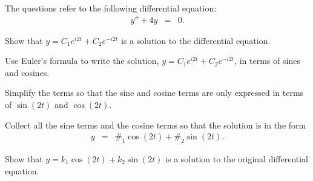   \begin{problem}

  \item The questions refer to the following differential equation:
    \begin{eqnarray*}
      y'' + 4y & = & 0.
    \end{eqnarray*}

    \begin{subproblem}
      \item Show that $y=C_1 e^{i2t} + C_2 e^{-i2t}$ is a solution to
        the differential equation.
        \vfill

      \item Use Euler's formula to write the solution, $y=C_1 e^{i2t}
        + C_2 e^{-i2t}$, in terms of sines and cosines.
        \vfill

        \clearpage

      \item Simplify the terms so that the sine and cosine terms are
        only expressed in terms of $\sin(2t)$ and $\cos(2t)$.

        \vfill

      \item Collect all the sine terms and the cosine terms so that
        the solution is in the form
        \begin{eqnarray*}
          y & = & \#_1 \cos(2t) + \#_2 \sin(2t).
        \end{eqnarray*}
        \vfill

      \item Show that $y=k_1 \cos(2t) + k_2 \sin(2t)$ is a solution to
        the original differential equation.
        \vfill
        

    \end{subproblem}


\end{problem}
